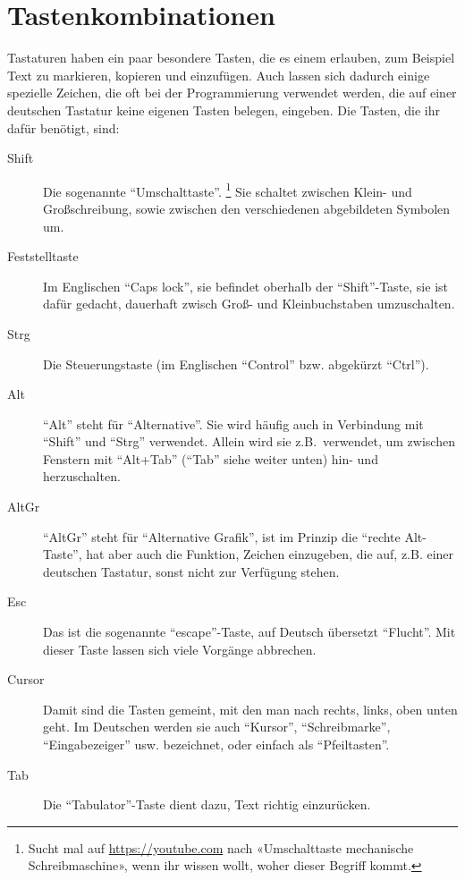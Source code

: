 \section{Tastenkombinationen}
\label{sec:ref::hotkeys}

Tastaturen haben ein paar besondere Tasten, die es einem erlauben, zum Beispiel Text zu markieren, kopieren und einzufügen. Auch lassen sich dadurch einige spezielle Zeichen, die oft bei der Programmierung verwendet werden, die auf einer deutschen Tastatur keine eigenen Tasten belegen, eingeben. Die Tasten, die ihr dafür benötigt, sind:
\begin{description}
    \item[Shift]
        Die sogenannte ``Umschalttaste''.
        \protect\footnote{%
            Sucht mal auf \url{https://youtube.com} nach «Umschalttaste mechanische Schreibmaschine», wenn ihr wissen wollt, woher dieser Begriff kommt.}%
        Sie schaltet zwischen Klein- und Großschreibung, sowie zwischen den verschiedenen abgebildeten Symbolen um.
    \item[Feststelltaste]
        Im Englischen ``Caps lock'', sie befindet oberhalb der ``Shift''-Taste, sie ist dafür gedacht, dauerhaft zwisch Groß- und Kleinbuchstaben umzuschalten.
    \item[Strg]
        Die Steuerungstaste (im Englischen ``Control'' bzw. abgekürzt ``Ctrl'').
    \item[Alt]
        ``Alt'' steht für ``Alternative''. Sie wird häufig auch in Verbindung mit ``Shift'' und ``Strg'' verwendet. Allein wird sie z.B.\ verwendet, um zwischen Fenstern mit ``Alt+Tab'' (``Tab'' siehe weiter unten) hin- und herzuschalten.
    \item[AltGr]
        ``AltGr'' steht für ``Alternative Grafik'', ist im Prinzip die ``rechte Alt-Taste'', hat aber auch die Funktion, Zeichen einzugeben, die auf, z.B. einer deutschen Tastatur, sonst nicht zur Verfügung stehen.
    \item[Esc]
        Das ist die sogenannte ``escape''-Taste, auf Deutsch übersetzt ``Flucht''. Mit dieser Taste lassen sich viele Vorgänge abbrechen.
    \item[Cursor]
        Damit sind die Tasten gemeint, mit den man nach rechts, links, oben unten geht. Im Deutschen werden sie auch ``Kursor'', ``Schreibmarke'', ``Eingabezeiger'' usw. bezeichnet, oder einfach als ``Pfeiltasten''.
    \item[Tab]
        Die ``Tabulator''-Taste dient dazu, Text richtig einzurücken.
\end{description}

